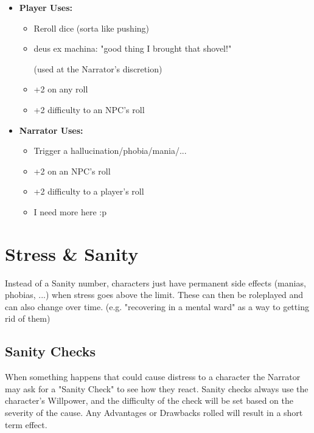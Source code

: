 \begin{itemize}
    \item \textbf{Player Uses:}
    \begin{itemize}
        \item Reroll dice (sorta like pushing)
        \item deus ex machina: "good thing I brought that shovel!" \par(used at the Narrator's discretion)
        \item +2 on any roll
        \item +2 difficulty to an NPC's roll
    \end{itemize}
    \item \textbf{Narrator Uses:}
    \begin{itemize}
        \item Trigger a hallucination/phobia/mania/...
        \item +2 on an NPC's roll
        \item +2 difficulty to a player's roll
        \item I need more here :p
    \end{itemize}
\end{itemize}

    
\chapter{Stress \& Sanity}

Instead of a Sanity number, characters just have permanent side effects (manias, phobias, ...) when stress goes above the limit. These can then be roleplayed and can also change over time. (e.g. "recovering in a mental ward" as a way to getting rid of them)

\section{Sanity Checks}
When something happens that could cause distress to a character 
the Narrator may ask for a "Sanity Check" to see how they react.
Sanity checks always use the character's Willpower, and the difficulty of the check will be set based on the severity of the cause. 
Any Advantages or Drawbacks rolled will result in a short term effect.

